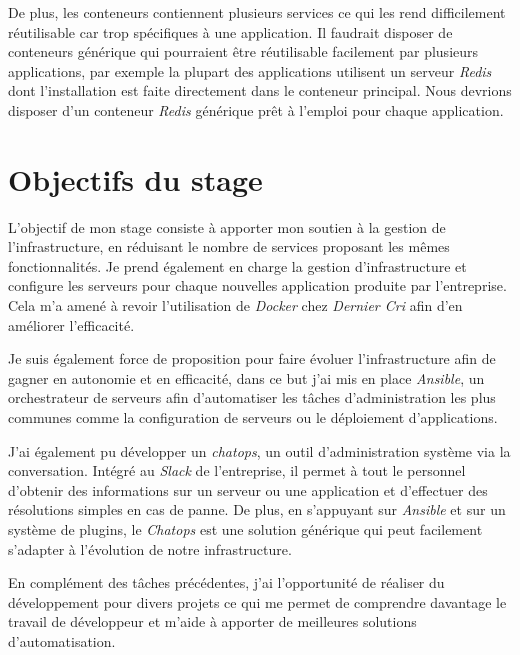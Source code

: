 \documentclass[12pt,a4paper]{article}
\begin{document}
  De plus, les conteneurs contiennent plusieurs services ce qui les rend
  difficilement réutilisable car trop spécifiques à une application. Il
  faudrait disposer de conteneurs générique qui pourraient être
  réutilisable facilement par plusieurs applications, par exemple la
  plupart des applications utilisent un serveur \emph{Redis} dont
  l'installation est faite directement dans le conteneur principal. Nous
  devrions disposer d'un conteneur \emph{Redis} générique prêt à l'emploi
  pour chaque application.

  \newpage

  \section{Objectifs du stage}\label{objectifs-du-stage}

  \bigskip

  L'objectif de mon stage consiste à apporter mon soutien à la gestion de
  l'infrastructure, en réduisant le nombre de services proposant les mêmes
  fonctionnalités. Je prend également en charge la gestion
  d'infrastructure et configure les serveurs pour chaque nouvelles
  application produite par l'entreprise. Cela m'a amené à revoir
  l'utilisation de \emph{Docker} chez \emph{Dernier Cri} afin d'en
  améliorer l'efficacité.

  \bigskip

  Je suis également force de proposition pour faire évoluer
  l'infrastructure afin de gagner en autonomie et en efficacité, dans ce
  but j'ai mis en place \emph{Ansible}, un orchestrateur de serveurs afin
  d'automatiser les tâches d'administration les plus communes comme la
  configuration de serveurs ou le déploiement d'applications.

  \bigskip

  J'ai également pu développer un \emph{chatops}, un outil
  d'administration système via la conversation. Intégré au \emph{Slack} de
  l'entreprise, il permet à tout le personnel d'obtenir des informations
  sur un serveur ou une application et d'effectuer des résolutions simples
  en cas de panne. De plus, en s'appuyant sur \emph{Ansible} et sur un
  système de plugins, le \emph{Chatops} est une solution générique qui
  peut facilement s'adapter à l'évolution de notre infrastructure.

  \bigskip

  En complément des tâches précédentes, j'ai l'opportunité de réaliser du
  développement pour divers projets ce qui me permet de comprendre
  davantage le travail de développeur et m'aide à apporter de meilleures
  solutions d'automatisation.
\end{document}
